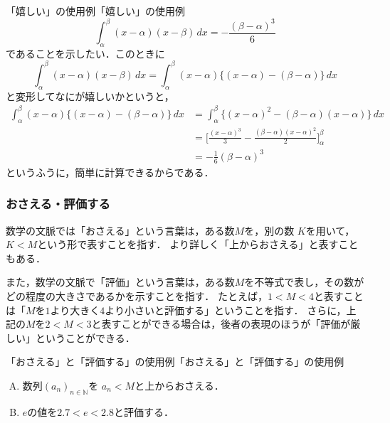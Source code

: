 \documentclass[a4paper,11pt]{ltjsarticle}
\begin{document}
\begin{example}{「嬉しい」の使用例}{「嬉しい」の使用例}
  \[
    \int_{\alpha}^{\beta} (x-\alpha)(x-\beta)\, dx = -\frac{(\beta-\alpha)^3}{6}
  \]
  であることを示したい．このときに
  \[
    \int_{\alpha}^{\beta} (x-\alpha)(x-\beta)\, dx = \int_{\alpha}^{\beta}  (x-\alpha)\{(x-\alpha) - (\beta-\alpha)\} \, dx
  \]
  と変形してなにが嬉しいかというと，
  \begin{align*}
    \int_{\alpha}^{\beta}  (x-\alpha)\{(x-\alpha) - (\beta-\alpha)\} \, dx & = \int_{\alpha}^{\beta} \{  (x-\alpha)^2 -(\beta-\alpha)(x-\alpha) \} \, dx                        \\
                                                                           & = \Biggl [ \frac{(x-\alpha)^3}{3} - \frac{(\beta-\alpha)(x-\alpha)^2}{2} \Biggr ]_{\alpha}^{\beta} \\
                                                                           & = - \frac{1}{6} (\beta-\alpha)^3
  \end{align*}
  というふうに，簡単に計算できるからである．
\end{example}



\subsubsection{おさえる・評価する}

数学の文脈では「おさえる」という言葉は，ある数$M$を，別の数 $K$を用いて，$K<M$という形で表すことを指す．
より詳しく「上からおさえる」と表すこともある．

また，数学の文脈で「評価」という言葉は，ある数$M$を不等式で表し，その数がどの程度の大きさであるかを示すことを指す．
たとえば，$ 1 < M <4$と表すことは「$M$を$1$より大きく$4$より小さいと評価する」ということを指す．
さらに，上記の$M$を$ 2< M <3$と表すことができる場合は，後者の表現のほうが「評価が厳しい」ということができる．

\begin{example}{「おさえる」と「評価する」の使用例}{「おさえる」と「評価する」の使用例}
  \begin{enumerate}[(A)]
    \item 数列$(a_n)_{n \in \mathbb{N}}$を $ a_n <M$と上からおさえる．
    \item $e$の値を$2.7 < e < 2.8$と評価する．
  \end{enumerate}
\end{example}
\end{document}
